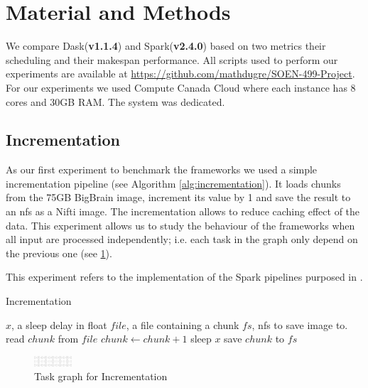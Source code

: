 \documentclass[11pt,a4paper]{article}
\begin{document}
\section{Material and Methods}
We compare Dask(\textbf{v1.1.4}) and Spark(\textbf{v2.4.0}) based on two metrics their scheduling and their makespan performance. All scripts used to perform our experiments are available at \href{https://github.com/mathdugre/SOEN-499-Project}{https://github.com/mathdugre/SOEN-499-Project}. For our experiments we used Compute Canada Cloud where each instance has 8 cores and 30GB RAM. The system was dedicated.
 
\subsection{Incrementation}
As our first experiment to benchmark the frameworks we used a simple incrementation pipeline (see Algorithm \ref{alg:incrementation}). It loads chunks from the 75GB BigBrain\citep{ds052:01} image, increment its value by 1 and save the result to an nfs as a Nifti image. The incrementation allows to reduce caching effect of the data. This experiment allows us to study the behaviour of the frameworks when all input are processed independently; i.e. each task in the graph only depend on the previous one (see \ref{fig:tg-inc}).

This experiment refers to  the implementation of the Spark pipelines purposed in \citet{Hayot-Sasson:17}.

\begin{algorithm}\caption{Incrementation}\label{alg:incrementation}
    \begin{algorithmic}
    \Require $x$, a sleep delay in float
    \Require $file$, a file containing a chunk
    \Require $fs$, nfs to save image to.
    \State read $chunk$ from $file$
        \State $chunk\gets chunk+1$
        \State sleep $x$
    \EndFor
    \EndFor
    \State save $chunk$ to $fs$
\end{algorithmic}
\end{algorithm}

\begin{figure}[ht]
    \centering
    \includegraphics[width=0.125\textwidth, angle=-90]{images/incrementation-task-graph.png}
    \caption{Task graph for Incrementation}
    \label{fig:tg-inc}
\end{figure}
\end{document}
